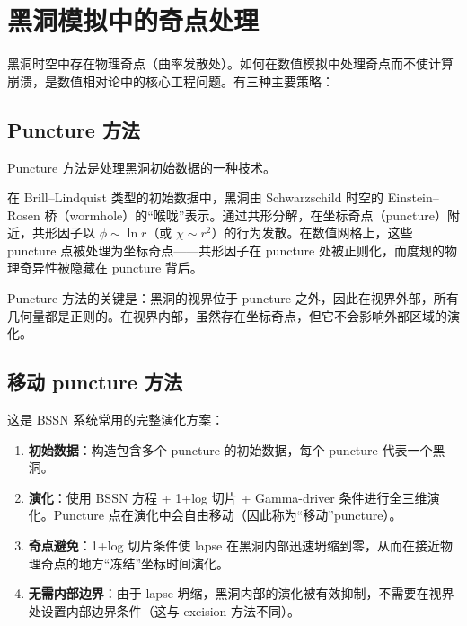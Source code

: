 \section{黑洞模拟中的奇点处理}
\label{sec:singularity_treatment}

黑洞时空中存在物理奇点（曲率发散处）。如何在数值模拟中处理奇点而不使计算崩溃，是数值相对论中的核心工程问题。有三种主要策略：

\subsection{Puncture 方法}

Puncture 方法是处理黑洞初始数据的一种技术。

\begin{definition}
在 Brill--Lindquist 类型的初始数据中，黑洞由 Schwarzschild 时空的 Einstein--Rosen 桥（wormhole）的“喉咙”表示。通过共形分解，在坐标奇点（puncture）附近，共形因子以 $\phi \sim \ln r$（或 $\chi \sim r^2$）的行为发散。在数值网格上，这些 puncture 点被处理为坐标奇点——共形因子在 puncture 处被正则化，而度规的物理奇异性被隐藏在 puncture 背后。
\label{def:puncture}
\end{definition}

Puncture 方法的关键是：黑洞的视界位于 puncture 之外，因此在视界外部，所有几何量都是正则的。在视界内部，虽然存在坐标奇点，但它不会影响外部区域的演化。

\subsection{移动 puncture 方法}

这是 BSSN 系统常用的完整演化方案：

\begin{enumerate}
    \item \textbf{初始数据}：构造包含多个 puncture 的初始数据，每个 puncture 代表一个黑洞。
    \item \textbf{演化}：使用 BSSN 方程 + 1+log 切片 + Gamma-driver 条件进行全三维演化。Puncture 点在演化中会自由移动（因此称为“移动”puncture）。
    \item \textbf{奇点避免}：1+log 切片条件使 lapse 在黑洞内部迅速坍缩到零，从而在接近物理奇点的地方“冻结”坐标时间演化。
    \item \textbf{无需内部边界}：由于 lapse 坍缩，黑洞内部的演化被有效抑制，不需要在视界处设置内部边界条件（这与 excision 方法不同）。
\end{enumerate}

